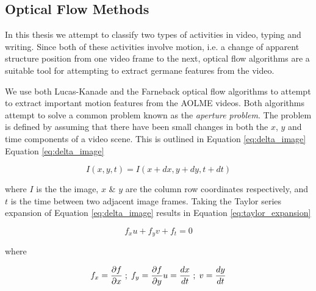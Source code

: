 \subsection{\label{section:optical_flow_methods}Optical Flow Methods}
In this thesis we attempt to classify two types of activities in video,  typing
and writing. Since both of these activities involve motion, i.e. a change of
apparent structure position from one video frame to the next, optical flow
algorithms  are a suitable tool for attempting to extract germane features from
the video.

We use both Lucas-Kanade \cite{lucas1981iterative} and the Farneback
\cite{farneback2003two}  optical flow algorithms to attempt to extract
important motion features from the AOLME videos. Both algorithms attempt to solve
a common problem known as the \textit{aperture problem}. The problem is defined
by assuming that there have been small changes in both the $x$, $y$ and time components
of a video scene. This is outlined in Equation \ref{eq:delta_image}
Equation \ref{eq:delta_image}

\begin{equation}
I(x,y,t) = I(x+dx, y+dy, t+dt)
\label{eq:delta_image}
\end{equation}

where $I$ is the the image, $x$ \& $y$ are the column row coordinates
respectively, and $t$ is the time between two adjacent image frames. Taking the
Taylor series expansion of Equation \ref{eq:delta_image} results in Equation
\ref{eq:taylor_expansion}


\begin{equation}
f_x u + f_y v + f_t = 0
\label{eq:taylor_expansion}
\end{equation}

where

\begin{equation}
f_x = \frac{\partial f}{\partial x} \; ; \; f_y = \frac{\partial f}{\partial y} \\
u = \frac{dx}{dt} \; ; \; v = \frac{dy}{dt}
\label{eq:taylor_expansion_partial}
\end{equation}

